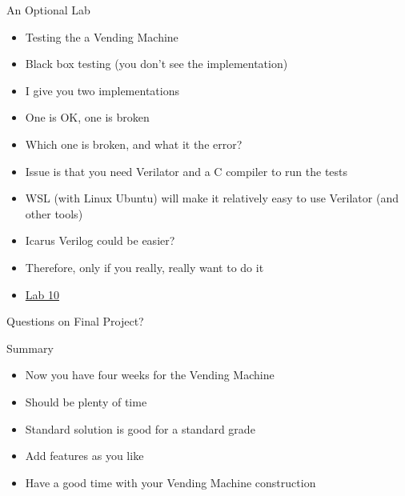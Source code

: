 \begin{frame}[fragile]{An Optional Lab}
\begin{itemize}
\item Testing the a Vending Machine
\item Black box testing (you don't see the implementation)
\item I give you two implementations
\item One is OK, one is broken
\item Which one is broken, and what it the error?
\item Issue is that you need Verilator and a C compiler to run the tests
\item WSL (with Linux Ubuntu) will make it relatively easy to use Verilator (and other tools)
\item Icarus Verilog could be easier?
\item Therefore, only if you really, really want to do it
\item \href{https://github.com/schoeberl/chisel-lab/tree/master/lab10}{Lab 10}
\end{itemize}
\end{frame}


\begin{frame}[fragile]{Questions on Final Project?}
\end{frame}


\begin{frame}[fragile]{Summary}
\begin{itemize}
\item Now you have four weeks for the Vending Machine
\item Should be plenty of time
\item Standard solution is good for a standard grade
\item Add features as you like
\item Have a good time with your Vending Machine construction
\end{itemize}
\end{frame}





